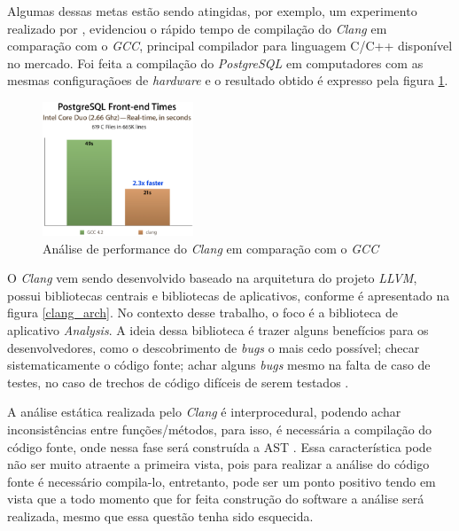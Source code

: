 Algumas dessas metas estão sendo atingidas, por exemplo, um experimento
realizado por , evidenciou o rápido
tempo de compilação do \emph{Clang} em comparação com o \emph{GCC}, principal
compilador para linguagem C/C++ disponível no mercado. Foi feita a compilação do \textit{PostgreSQL} em computadores com as
mesmas configuraçãoes de \textit{hardware} e o resultado obtido é expresso pela figura \ref{clang_gcc}.

\begin{figure}[h]
  \centering
  \includegraphics[width=0.4\textwidth]
      {figuras/clang_gcc.eps}
      \caption{Análise de performance do \emph{Clang} em comparação com o
      \emph{GCC} \cite{naroff2009}}
  \label{clang_gcc}
\end{figure}

O \emph{Clang} vem sendo desenvolvido baseado na arquitetura do projeto
\emph{LLVM}, possui bibliotecas centrais e bibliotecas de 
aplicativos, conforme é apresentado na figura \ref{clang_arch}. No contexto desse trabalho, o foco é a biblioteca de aplicativo
\textit{Analysis}. A ideia dessa biblioteca é trazer alguns benefícios para os desenvolvedores, como o descobrimento de 
\textit{bugs} o mais cedo possível; checar sistematicamente o código fonte; achar alguns \textit{bugs} mesmo na falta de caso
de testes, no caso de trechos de código difíceis de serem testados \cite{kremenek2009}. 

A análise estática realizada pelo \emph{Clang} é interprocedural, podendo achar inconsistências entre funções/métodos, para isso,
é necessária a compilação do código fonte, onde nessa fase será construída a AST 
\cite{kremenek2009}. Essa característica pode não ser muito atraente a primeira vista, pois para realizar a análise do código 
fonte é necessário compila-lo, entretanto, pode ser um ponto positivo tendo em vista que a todo momento que for feita 
construção do software a análise será realizada, mesmo que essa questão tenha sido esquecida.

